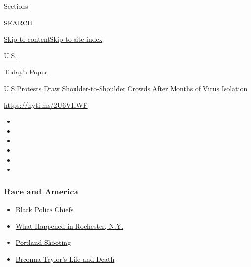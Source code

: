 Sections

SEARCH

\protect\hyperlink{site-content}{Skip to
content}\protect\hyperlink{site-index}{Skip to site index}

\href{https://www.nytimes3xbfgragh.onion/section/us}{U.S.}

\href{https://myaccount.nytimes3xbfgragh.onion/auth/login?response_type=cookie\&client_id=vi}{}

\href{https://www.nytimes3xbfgragh.onion/section/todayspaper}{Today's
Paper}

\href{/section/us}{U.S.}\textbar{}Protests Draw Shoulder-to-Shoulder
Crowds After Months of Virus Isolation

\url{https://nyti.ms/2U6VHWF}

\begin{itemize}
\item
\item
\item
\item
\item
\item
\end{itemize}

\hypertarget{race-and-america}{%
\subsubsection{\texorpdfstring{\href{https://www.nytimes3xbfgragh.onion/news-event/george-floyd-protests-minneapolis-new-york-los-angeles?name=styln-george-floyd\&region=TOP_BANNER\&block=storyline_menu_recirc\&action=click\&pgtype=Article\&impression_id=0708ef40-f4b7-11ea-8618-eb506373a11e\&variant=undefined}{Race
and America}}{Race and America}}\label{race-and-america}}

\begin{itemize}
\tightlist
\item
  \href{https://www.nytimes3xbfgragh.onion/2020/09/11/us/black-police-chiefs-reform.html?name=styln-george-floyd\&region=TOP_BANNER\&block=storyline_menu_recirc\&action=click\&pgtype=Article\&impression_id=0708ef41-f4b7-11ea-8618-eb506373a11e\&variant=undefined}{Black
  Police Chiefs}
\item
  \href{https://www.nytimes3xbfgragh.onion/2020/09/04/nyregion/rochester-police-daniel-prude.html?name=styln-george-floyd\&region=TOP_BANNER\&block=storyline_menu_recirc\&action=click\&pgtype=Article\&impression_id=07091650-f4b7-11ea-8618-eb506373a11e\&variant=undefined}{What
  Happened in Rochester, N.Y.}
\item
  \href{https://www.nytimes3xbfgragh.onion/2020/08/30/us/portland-shooting-explained.html?name=styln-george-floyd\&region=TOP_BANNER\&block=storyline_menu_recirc\&action=click\&pgtype=Article\&impression_id=07091651-f4b7-11ea-8618-eb506373a11e\&variant=undefined}{Portland
  Shooting}
\item
  \href{https://www.nytimes3xbfgragh.onion/2020/08/30/us/breonna-taylor-police-killing.html?name=styln-george-floyd\&region=TOP_BANNER\&block=storyline_menu_recirc\&action=click\&pgtype=Article\&impression_id=07091652-f4b7-11ea-8618-eb506373a11e\&variant=undefined}{Breonna
  Taylor's Life and Death}
\end{itemize}

